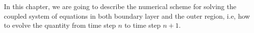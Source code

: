
%
%  
%
%  


In this chapter, we are going to describe the numerical scheme for solving the coupled system of equations in both boundary layer and the outer region, i.e, how to evolve the quantity from time step $n$ to time step $n+1$.



